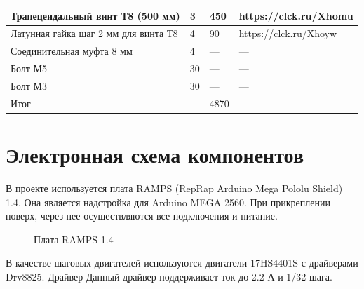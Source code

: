 \documentclass[a4paper,12pt]{article}
\theoremstyle{plain}                          %
\theoremstyle{definition}                     %
\theoremstyle{remark}                         %
\begin{document}
\begin{table}[!ht]
\begin{tabular}{|p{7cm}|p{2cm}|p{2cm}|p{5cm}|}
        Трапецеидальный винт Т8 (500 мм)                         & 3                    & 450               & https://clck.ru/Xhomu \\ \hline
        Латунная гайка шаг 2 мм для винта Т8                     & 4                    & 90                & https://clck.ru/Xhoyw \\ \hline
        Соединительная муфта 8 мм                                & 4                    & ---               & ---                   \\ \hline
        Болт М5                                                  & 30                   & ---               & ---                   \\ \hline
        Болт М3                                                  & 30                   & ---               & ---                   \\ \hline
        Итог                                                     & ~                    & 4870                                      \\ \hline
    \end{tabular}
\end{table}

\section{Электронная схема компонентов}

В проекте используется плата RAMPS (RepRap Arduino Mega Pololu Shield) 1.4.
Она является надстройка для Arduino MEGA 2560. При прикреплении поверх, через нее осуществляются все подключения и питание.

\begin{figure}[H]
    \caption{Плата RAMPS 1.4}
\end{figure}

В качестве шаговых двигателей используются двигатели 17HS4401S с драйверами Drv8825. Драйвер
Данный драйвер поддерживает ток до 2.2 А и 1/32 шага.
\end{document}
